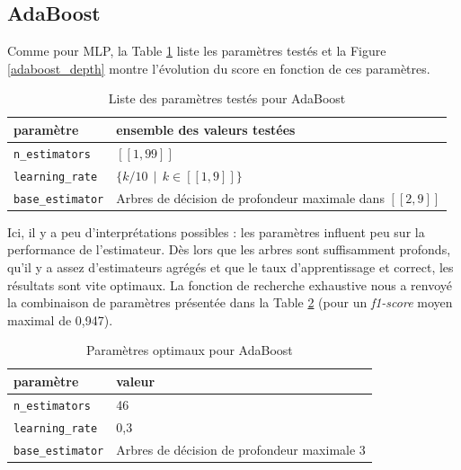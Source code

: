 \documentclass[a4paper]{report}
\begin{document}

\subsection{AdaBoost}

Comme pour MLP, la Table \ref{params_ada} liste les paramètres testés et la Figure \ref{adaboost_depth} montre l'évolution du score en fonction de ces paramètres.

\begin{table}
\centering
\begin{tabular}{ll}
paramètre & ensemble des valeurs testées \\
\hline
\texttt{n\_estimators} & $[\![1, 99]\!]$ \\
\texttt{learning\_rate} & $\{k/10 \>\> | \>\> k \in [\![1, 9]\!] \}$ \\
\texttt{base\_estimator} & Arbres de décision de profondeur maximale dans $[\![2, 9]\!]$\\
\end{tabular}
\caption{Liste des paramètres testés pour AdaBoost\label{params_ada}}
\end{table}

Ici, il y a peu d'interprétations possibles : les paramètres influent peu sur la performance de l'estimateur. Dès lors que les arbres sont suffisamment profonds, qu'il y a assez d'estimateurs agrégés et que le taux d'apprentissage et correct, les résultats sont vite optimaux. La fonction de recherche exhaustive nous a renvoyé la combinaison de paramètres présentée dans la Table \ref{best_params_ada} (pour un \emph{f1-score} moyen maximal de 0,947).

\begin{table}[h]
\centering
\begin{tabular}{ll}
paramètre & valeur \\
\hline
\texttt{n\_estimators} & 46 \\
\texttt{learning\_rate} & 0,3 \\
\texttt{base\_estimator} & Arbres de décision de profondeur maximale 3\\
\end{tabular}
\caption{Paramètres optimaux pour AdaBoost\label{best_params_ada}}
\end{table}
\end{document}
